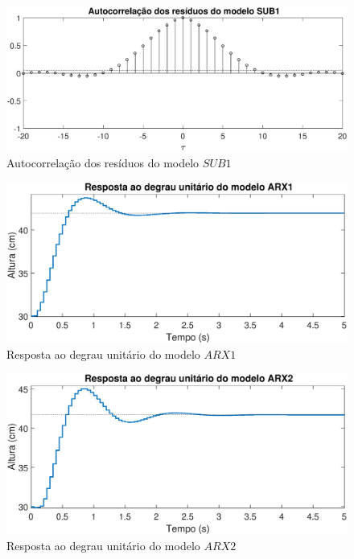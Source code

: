 \begin{figure}[H]
	\centering
	\includegraphics[width=1\linewidth]{autocorrelacaosub1}
	\caption[Autocorrelação dos resíduos do modelo $SUB1$]{Autocorrelação dos resíduos do modelo $SUB1$}
	\label{fig:autocorrelacaosub1}
\end{figure}

\begin{figure}[H]
	\centering
	\includegraphics[width=1\linewidth]{respostadegrauarx1}
	\caption[Resposta ao degrau do modelo $ARX1$]{Resposta ao degrau unitário do modelo $ARX1$}
	\label{fig:respostadegrauarx1}
\end{figure}

\begin{figure}[H]
	\centering
	\includegraphics[width=1\linewidth]{respostadegrauarx2}
	\caption[Resposta ao degrau do modelo $ARX2$]{Resposta ao degrau unitário do modelo $ARX2$}
	\label{fig:respostadegrauarx2}
\end{figure}

